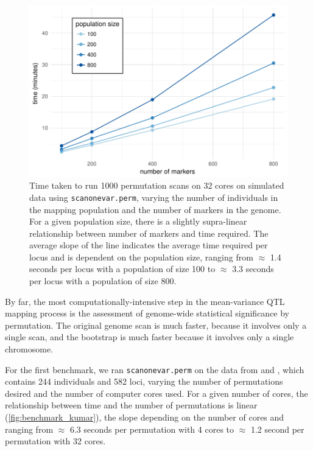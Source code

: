 \documentclass[9pt,twocolumn,twoside]{gsag3jnl}
\begin{document}
\begin{figure}[t]
    \includegraphics[width = \linewidth]{images/benchmark_sim_cross.pdf}
    \caption{
        Time taken to run 1000 permutation scans on 32 cores on simulated data using \texttt{scanonevar.perm}, varying the number of individuals in the mapping population and the number of markers in the genome.
        For a given population size, there is a slightly supra-linear relationship between number of markers and time required.
        The average slope of the line indicates the average time required per locus and is dependent on the population size, ranging from $\approx$ 1.4 seconds per locus with a population of size 100 to $\approx$ 3.3 seconds per locus with a population of size 800.
    }
    \label{fig:benchmark_sim_cross}
\end{figure}

By far, the most computationally-intensive step in the mean-variance QTL mapping process is the assessment of genome-wide statistical significance by permutation.
The original genome scan is much faster, because it involves only a single scan, and the bootstrap is much faster because it involves only a single chromosome.

For the first benchmark, we ran \texttt{scanonevar.perm} on the data from \citet{Kumar2013} and \CortyReanalysisPaper, which contains 244 individuals and 582 loci, varying the number of permutations desired and the number of computer cores used.
For a given number of cores, the relationship between time and the number of permutations is linear (\autoref{fig:benchmark_kumar}), the slope depending on the number of cores and ranging from $\approx$ 6.3 seconds per permutation with 4 cores to $\approx$ 1.2 second per permutation with 32 cores.
\end{document}
